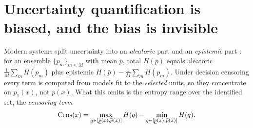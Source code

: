 \section{Uncertainty quantification is biased, and the bias is invisible}
\label{sec:uncertainty}

Modern systems split uncertainty into an \emph{aleatoric} part and an
\emph{epistemic} part \citep{depeweg2018decomposition,
hullermeier2021aleatoric}: for an ensemble $\{p_m\}_{m\le M}$ with mean
$\bar p$, total $H(\bar p)$ equals aleatoric $\tfrac1M\sum_mH(p_m)$ plus
epistemic $H(\bar p)-\tfrac1M\sum_mH(p_m)$. Under decision censoring every
term is computed from models fit to the \emph{selected} units, so they
concentrate on $p_1(x)$, not $p(x)$. What this omits is the entropy range over
the identified set, the \emph{censoring term}
\begin{equation}
  \mathrm{Cens}(x)=\max_{q\in[\underline{p}(x),\overline{p}(x)]}H(q)-\min_{q\in[\underline{p}(x),\overline{p}(x)]}H(q).
  \label{eq:cens}
\end{equation}

